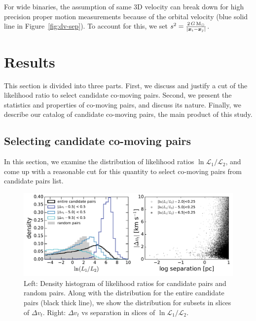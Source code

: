 \documentclass[manuscript, letterpaper]{aastex6}
\newcommand{\bs}[1]{\boldsymbol{#1}}
\renewcommand{\vec}[1]{\bs{#1}}
\newcommand{\msun}{{\rm M}_\odot}
\begin{document}
For wide binaries, the assumption of same 3D velocity can break down
for high precision proper motion measurements because of the orbital
velocity (blue solid line in Figure~\ref{fig:dv-sep}).
To account for this, we set $s^2 = \frac{2 \, G \, \msun}{|\vec{x}_i-\vec{x}_j|}$.

\section{Results}

This section is divided into three parts. First, we discuss and justify a cut of
the likelihood ratio to select candidate co-moving pairs.
Second, we present the statistics and properties of co-moving pairs, and discuss its nature.
Finally, we describe our catalog of candidate co-moving pairs, the main product
of this study.

\subsection{Selecting candidate co-moving pairs}
\label{sub:selection}

In this section, we examine the distribution of likelihood ratios
$\ln \mathcal{L}_1 /\mathcal{L}_2$, and come up with a reasonable cut
for this quantity to select co-moving pairs from candidate pairs list.

\begin{figure}[htbp]
  \begin{center}
    \includegraphics[width=\textwidth]{figures/likelihoodratios.pdf}
  \end{center}
  \caption{%
    Left: Density histogram of likelihood ratios for candidate pairs and random pairs.
    Along with the distribution for the entire candidate pairs (black thick line),
    we show the distribution for subsets in slices of $\Delta v_t$.
    Right: $\Delta v_t$ vs separation in slices of $\ln \mathcal{L}_1 /\mathcal{L}_2$.
    \label{fig:likelihoodratios}}
\end{figure}
\end{document}
